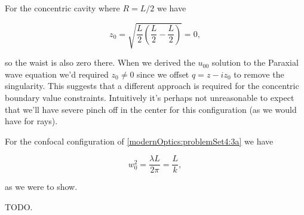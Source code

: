 {For the concentric cavity where $R = L/2$ we have

\begin{equation}\label{eqn:problemSet4Problem2:160}
z_0 = \sqrt{\frac{L}{2} \left( \frac{L}{2} - \frac{L}{2}\right)} = 0,
\end{equation}

so the waist is also zero there.  When we derived the $u_{00}$ solution to the Paraxial wave equation we'd required $z_0 \ne 0$ since we offset $q = z - i z_0$ to remove the singularity.  This suggests that a different approach is required for the concentric boundary value constraints.  Intuitively it's perhaps not unreasonable to expect that we'll have severe pinch off in the center for this configuration (as we would have for rays).

For the confocal configuration of \ref{modernOptics:problemSet4:3a} we have

\begin{equation}\label{eqn:problemSet4Problem2:180}
w_0^2 = \frac{\lambda L}{2 \pi} = \frac{L}{k},
\end{equation}

as we were to show.


TODO.
}

